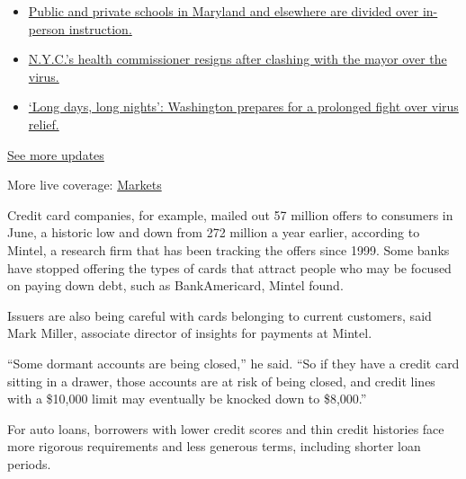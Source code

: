 \begin{itemize}
\tightlist
\item
  \href{https://www.nytimes.com/2020/08/04/world/coronavirus-cases.html?action=click\&pgtype=Article\&state=default\&region=MAIN_CONTENT_1\&context=storylines_live_updates\#link-4825b93}{Public
  and private schools in Maryland and elsewhere are divided over
  in-person instruction.}
\item
  \href{https://www.nytimes.com/2020/08/04/world/coronavirus-cases.html?action=click\&pgtype=Article\&state=default\&region=MAIN_CONTENT_1\&context=storylines_live_updates\#link-4d1eafa8}{N.Y.C.'s
  health commissioner resigns after clashing with the mayor over the
  virus.}
\item
  \href{https://www.nytimes.com/2020/08/04/world/coronavirus-cases.html?action=click\&pgtype=Article\&state=default\&region=MAIN_CONTENT_1\&context=storylines_live_updates\#link-6b644638}{`Long
  days, long nights': Washington prepares for a prolonged fight over
  virus relief.}
\end{itemize}

\href{https://www.nytimes.com/2020/08/04/world/coronavirus-cases.html?action=click\&pgtype=Article\&state=default\&region=MAIN_CONTENT_1\&context=storylines_live_updates}{See
more updates}

More live coverage:
\href{https://www.nytimes.com/live/2020/08/04/business/stock-market-today-coronavirus?action=click\&pgtype=Article\&state=default\&region=MAIN_CONTENT_1\&context=storylines_live_updates}{Markets}

Credit card companies, for example, mailed out 57 million offers to
consumers in June, a historic low and down from 272 million a year
earlier, according to Mintel, a research firm that has been tracking the
offers since 1999. Some banks have stopped offering the types of cards
that attract people who may be focused on paying down debt, such as
BankAmericard, Mintel found.

Issuers are also being careful with cards belonging to current
customers, said Mark Miller, associate director of insights for payments
at Mintel.

``Some dormant accounts are being closed,'' he said. ``So if they have a
credit card sitting in a drawer, those accounts are at risk of being
closed, and credit lines with a \$10,000 limit may eventually be knocked
down to \$8,000.''

For auto loans, borrowers with lower credit scores and thin credit
histories face more rigorous requirements and less generous terms,
including shorter loan periods.

